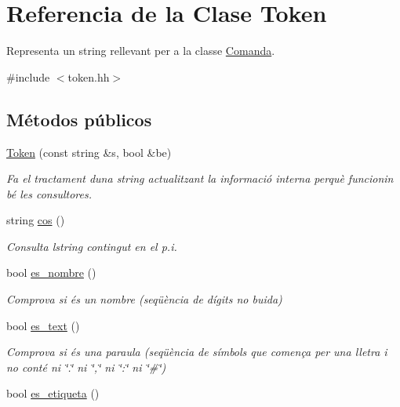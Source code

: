 \hypertarget{class_token}{}\section{Referencia de la Clase Token}
\label{class_token}


Representa un string rellevant per a la classe \hyperlink{class_comanda}{Comanda}.  




{\ttfamily \#include $<$token.\+hh$>$}

\subsection*{Métodos públicos}
\begin{DoxyCompactItemize}
\item 
\hyperlink{class_token_a2ecb0099476455ed7ce3c05abcbb2e31}{Token} (const string \&s, bool \&be)
\begin{DoxyCompactList}\small\item\em Fa el tractament d\textquotesingle{}una string actualitzant la informació interna perquè funcionin bé les consultores. \end{DoxyCompactList}\item 
string \hyperlink{class_token_a3cadf105c92e161b50eea2d8096cb608}{cos} ()
\begin{DoxyCompactList}\small\item\em Consulta l\textquotesingle{}string contingut en el p.\+i. \end{DoxyCompactList}\item 
bool \hyperlink{class_token_a53411d8b5b08289a126944104d246380}{es\+\_\+nombre} ()
\begin{DoxyCompactList}\small\item\em Comprova si és un nombre (seqüència de dígits no buida) \end{DoxyCompactList}\item 
bool \hyperlink{class_token_ab40c482fd70278c5f8ce53aa364d957e}{es\+\_\+text} ()
\begin{DoxyCompactList}\small\item\em Comprova si és una paraula (seqüència de símbols que comença per una lletra i no conté ni \char`\"{}.\char`\"{} ni \char`\"{},\char`\"{} ni \char`\"{}\+:\char`\"{} ni \char`\"{}\#\char`\"{}) \end{DoxyCompactList}\item 
bool \hyperlink{class_token_ad2949808a3a5d2afba78768e18005cbd}{es\+\_\+etiqueta} ()

\end{DoxyCompactItemize}
